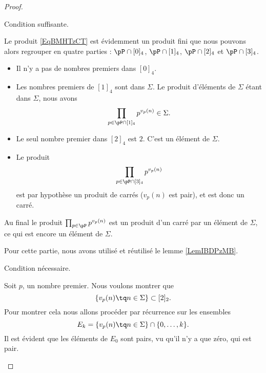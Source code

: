 \begin{proof}
    \begin{subproof}
    \item[Condition suffisante.]
        
        Le produit \eqref{EqBMHTzCT} est évidemment un produit fini que nous pouvons alors regrouper en quatre parties : \( \pP\cap[0]_4\), \( \pP\cap[1]_4\), \( \pP\cap[2]_4\) et \( \pP\cap[3]_4\).

        \begin{itemize}
            \item Il n'y a pas de nombres premiers dans \( [0]_4\).
            \item Les nombres premiers de \( [1]_4\) sont dans \( \Sigma\). Le produit d'éléments de \( \Sigma\) étant dans \( \Sigma\), nous avons
                \begin{equation}
                    \prod_{p\in\pP\cap[1]_4}p^{v_p(n)}\in \Sigma.
                \end{equation}
            \item
                Le seul nombre premier dans \( [2]_4\) est \( 2\). C'est un élément de \( \Sigma\).
            \item
                Le produit
                \begin{equation}
                    \prod_{p\in\pP\cap[3]_4}p^{v_p(n)}
                \end{equation}
                est par hypothèse un produit de carrés (\( v_p(n)\) est pair), et est donc un carré.
        \end{itemize}
        Au final le produit \( \prod_{p\in\pP}p^{v_p(n)}\) est un produit d'un carré par un élément de \( \Sigma\), ce qui est encore un élément de \( \Sigma\).

        Pour cette partie, nous avons utilisé et réutilisé le lemme \ref{LemIBDPzMB}.

    \item[Condition nécessaire.] 

        Soit \( p\), un nombre premier. Nous voulons montrer que
        \begin{equation}
            \{ v_p(n)\tq n\in \Sigma \}\subset [2]_2.
        \end{equation}
        Pour montrer cela nous allons procéder par récurrence sur les ensembles
        \begin{equation}
            E_k=\{ v_p(n)\tq n\in \Sigma \}\cap\{ 0,\ldots, k \}.
        \end{equation}
        Il est évident que les éléments de \( E_0\) sont pairs, vu qu'il n'y a que zéro, qui est pair.


\end{subproof}
\end{proof}
